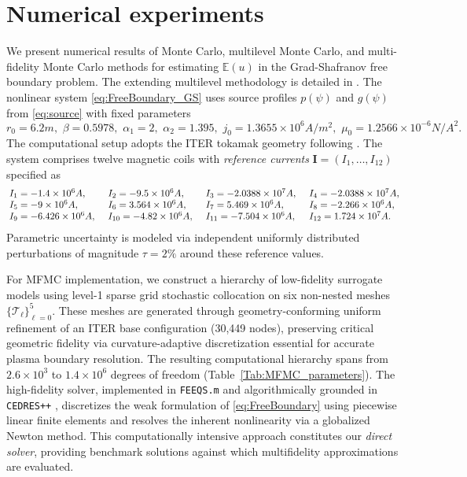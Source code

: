 \section{Numerical experiments}\label{sec:Num-Exp}
%
We present numerical results of Monte Carlo, multilevel Monte Carlo, and multi-fidelity Monte Carlo  methods for estimating $\mathbb{E}(u)$ in the Grad-Shafranov free boundary problem. The extending multilevel methodology is detailed in \cite{ElLiSa:2023,Gi:2008,Gi:2015}. The nonlinear system \eqref{eq:FreeBoundary_GS} uses source profiles $p(\psi)$ and $g(\psi)$ from \eqref{eq:source} with fixed parameters
%
\begin{equation}\label{eq:CentralParameterValue}
r_0=6.2m,\,\,\beta=0.5978, \,\, \alpha_1 = 2, \,\,  \alpha_2=1.395, \,\, j_0=1.3655 \times 10^6 A/m^2,\,\,  \mu_0=1.2566\times 10^{-6} N/A^2.
\end{equation}
%
The computational setup adopts the ITER tokamak geometry \cite{Amoskov:2009} following \cite{FaHe:2017}. The system comprises twelve magnetic coils with \textit{reference currents} $\boldsymbol{I} = (I_1,\dots,I_{12})$ specified as
%
\begin{equation}\label{eq:CentralCurrentValue}
{\renewcommand{\arraycolsep}{2pt}
\begin{array}{llll}
I_1 = -1.4 \times 10^{6}A, \quad & I_2 = -9.5 \times 10^{6}A, \quad & I_3 = -2.0388 \times 10^{7}A, \quad & I_4 = -2.0388 \times 10^{7}A, \\
I_5 = -9 \times 10^{6}A, \quad & I_6 = 3.564 \times 10^{6}A, \quad & I_7 = 5.469 \times 10^{6}A, \quad & I_8 = -2.266 \times 10^{6}A, \\
I_9 = -6.426 \times 10^{6}A, \quad & I_{10} = -4.82 \times 10^{6}A, \quad & I_{11} = -7.504 \times 10^{6}A, \quad & I_{12} = 1.724 \times 10^{7}A.
\end{array}
}
\end{equation}
%
Parametric uncertainty is modeled via independent uniformly distributed perturbations of magnitude $\tau = 2\%$ around these reference values.


For MFMC implementation, we construct a hierarchy of low-fidelity surrogate models using level-1 sparse grid stochastic collocation on six non-nested meshes $\{\mathcal{T}_\ell\}_{\ell=0}^5$. These meshes are generated through geometry-conforming uniform refinement of an ITER base configuration (30,449 nodes), preserving critical geometric fidelity via curvature-adaptive discretization essential for accurate plasma boundary resolution. The resulting computational hierarchy spans from $2.6\times 10^3$ to $1.4\times 10^6$ degrees of freedom (Table~\ref{Tab:MFMC_parameters}). The high-fidelity solver, implemented in \texttt{FEEQS.m} \cite{Heumann:feeqsm} and algorithmically grounded in \texttt{CEDRES++} \cite{FaHe:2017,CEDRES}, discretizes the weak formulation of \eqref{eq:FreeBoundary} using piecewise linear finite elements and resolves the inherent nonlinearity via a globalized Newton method. This computationally intensive approach constitutes our \textit{direct solver}, providing benchmark solutions against which multifidelity approximations are evaluated.



